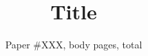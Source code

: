 \documentclass[sigconf,10pt]{acmart}
\begin{document}
\title{Title}


\author{Paper \#XXX, \pageref{end_of_body} body pages, \pageref{last_page} total}

\renewcommand{\shortauthors}{X.et al.}



\maketitle





\label{end_of_body}




\label{last_page}
\end{document}
